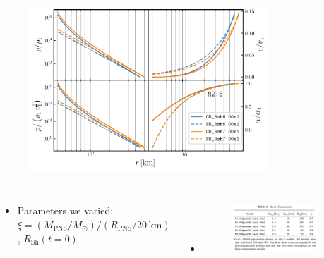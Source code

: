 \documentclass{beamer}
\newcommand{\msun}{M_{\odot}}
\newcommand{\mpns}{M_{\mathrm{PNS}}}
\newcommand{\rpns}{R_{\mathrm{PNS}}}
\newcommand{\rsh}{R_{\mathrm{Sh}}}
\begin{document}
\begin{frame}

  \begin{figure}[htb!]
    \centering
    \includegraphics[width=0.8\textwidth]{fig.CompareNRvsGR_SS_M2.8.pdf}
  \end{figure}

\end{frame}

\begin{frame}

  \begin{columns}[c]


      \begin{itemize}
        \item[]
          Parameters we varied:
          $\xi=\left(\mpns/\msun\right)/\left(\rpns/20\,\mathrm{km}\right)$
          \citep{oo2011},
          $\rsh\left(t=0\right)$
      \end{itemize}


      \begin{itemize}
        \item[]
            \begin{figure}[ht]
              \centering
              \includegraphics[width=0.9\textwidth]{paramspace.png}
          \end{figure}
      \end{itemize}

  \end{columns}

\end{frame}
\end{document}
